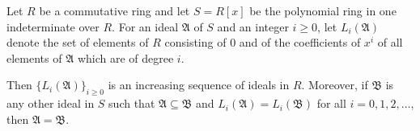 Let $R$ be a commutative ring and let $S = R[x]$ be the polynomial ring in one indeterminate over $R$. For an ideal $\mathfrak{A}$ of $S$ and an integer $i \geq 0$, let $L_i(\mathfrak{A})$ denote the set of elements of $R$ consisting of $0$ and of the coefficients of $x^i$ of all elements of $\mathfrak{A}$ which are of degree $i$.

Then $\{L_i(\mathfrak{A})\}_{i \geq 0}$ is an increasing sequence of ideals in $R$. Moreover, if $\mathfrak{B}$ is any other ideal in $S$ such that $\mathfrak{A} \subseteq \mathfrak{B}$ and $L_i(\mathfrak{A}) = L_i(\mathfrak{B})$ for all $i = 0, 1, 2, \dots$, then $\mathfrak{A} = \mathfrak{B}$.
